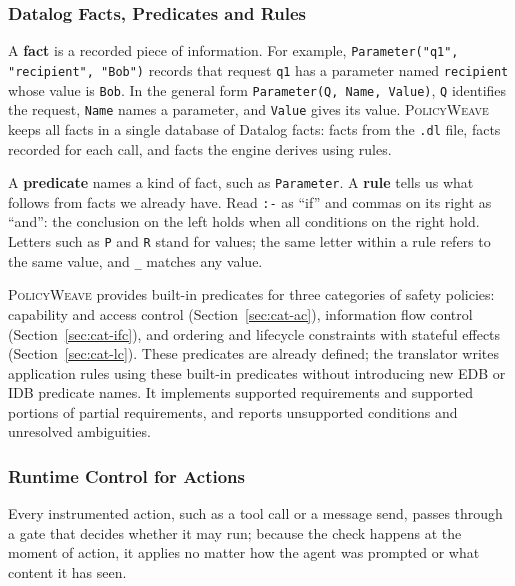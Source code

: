 \documentclass[10pt,letterpaper]{article}
\newcommand{\tool}{\textsc{PolicyWeave}}
\begin{document}
\subsubsection{Datalog Facts, Predicates and Rules}
\label{sec:catalog}

A \textbf{fact} is a recorded piece of information. For example,
\texttt{Parameter("q1", "recipient", "Bob")} records that request \texttt{q1}
has a parameter named \texttt{recipient} whose value is \texttt{Bob}. In the
general form \texttt{Parameter(Q, Name, Value)}, \texttt{Q} identifies the
request, \texttt{Name} names a parameter, and \texttt{Value} gives its value.
{\tool} keeps all facts in a single database of Datalog facts: facts from the
\texttt{.dl} file, facts recorded for each call, and facts the engine derives
using rules.

A \textbf{predicate} names a kind of fact, such as \texttt{Parameter}. A
\textbf{rule} tells us what follows from facts we already have. Read
\texttt{:-} as ``if'' and commas on its right as ``and'': the conclusion on the
left holds when all conditions on the right hold. Letters such as \texttt{P}
and \texttt{R} stand for values; the same letter within a rule refers to the
same value, and \texttt{\_} matches any value.

{\tool} provides built-in predicates for three categories of safety policies:
capability and access control (Section~\ref{sec:cat-ac}), information flow
control (Section~\ref{sec:cat-ifc}), and ordering and lifecycle constraints
with stateful effects (Section~\ref{sec:cat-lc}). These predicates are already
defined; the translator writes application rules using these built-in
predicates without introducing new EDB or IDB predicate names. It implements
supported requirements and supported portions of partial requirements, and
reports unsupported conditions and unresolved ambiguities.

\subsubsection{Runtime Control for Actions}
\label{sec:gate}

Every instrumented action, such as a tool call or a message send, passes
through a gate that decides whether it may run; because the check happens at
the moment of action, it applies no matter how the agent was prompted or what
content it has seen.
\end{document}
